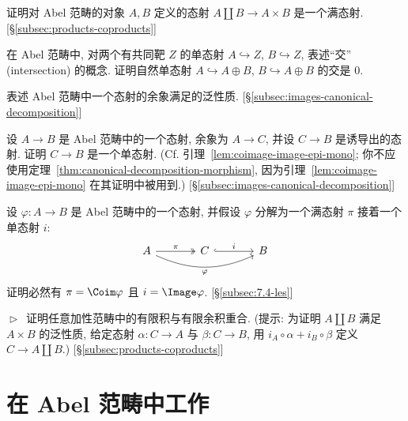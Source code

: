\begin{prob}\label{ex:1.17}
证明对 Abel 范畴的对象 $A,B$ 定义的态射 $A\amalg B\to A\times B$ 是一个满态射. [\S\ref{subsec:products-coproducts}]
\end{prob}

\begin{prob}\label{ex:1.18}
在 Abel 范畴中, 对两个有共同靶 $Z$ 的单态射 $A\hookrightarrow Z$, $B\hookrightarrow Z$, 表述``交'' (intersection) 的概念. 证明自然单态射 $A\hookrightarrow A\oplus B$, $B\hookrightarrow A\oplus B$ 的交是 $0$.
\end{prob}

\begin{prob}\label{ex:1.19}
表述 Abel 范畴中一个态射的余象满足的泛性质. [\S\ref{subsec:images-canonical-decomposition}]
\end{prob}

\begin{prob}\label{ex:1.20}
设 $A\to B$ 是 Abel 范畴中的一个态射, 余象为 $A\to C$, 并设 $C\to B$ 是诱导出的态射. 证明 $C\to B$ 是一个单态射. (Cf. 引理~\ref{lem:coimage-image-epi-mono}; 你不应使用定理~\ref{thm:canonical-decomposition-morphism}, 因为引理~\ref{lem:coimage-image-epi-mono} 在其证明中被用到.) [\S\ref{subsec:images-canonical-decomposition}]
\end{prob}

\begin{prob}\label{ex:1.21}
设 $\varphi:A\to B$ 是 Abel 范畴中的一个态射, 并假设 $\varphi$ 分解为一个满态射 $\pi$ 接着一个单态射 $i$:
\[
\begin{tikzcd}[ampersand replacement=\&,column sep=large]
A \ar[r,two heads,"\pi"] \ar[rr,bend right=24,"\varphi"'] \& C \ar[r,hook,"i"] \& B
\end{tikzcd}
\]
证明必然有 $\pi=\Coim\varphi$ 且 $i=\Image\varphi$. [\S\ref{subsec:7.4-les}]
\end{prob}

\begin{prob}\label{ex:1.22}
$\vartriangleright$\ 证明任意加性范畴中的有限积与有限余积重合. (提示: 为证明 $A\amalg B$ 满足 $A\times B$ 的泛性质, 给定态射 $\alpha:C\to A$ 与 $\beta:C\to B$, 用 $i_A\circ\alpha+i_B\circ\beta$ 定义 $C\to A\amalg B$.) [\S\ref{subsec:products-coproducts}]
\end{prob}

\section{在 Abel 范畴中工作}
\label{sec:working-abelian-categories}

